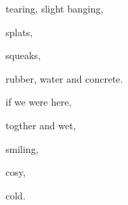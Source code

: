 \documentclass[extrafontsizes, 48pt]{memoir}
\newcommand\blankpage{%
    \null
    \thispagestyle{empty}%
    \addtocounter{page}{-1}%
    \newpage}
\begin{document}
	\begin{minipage}{.6\textwidth}
	tearing, slight banging,
	\end{minipage}
	\newpage

	\begin{minipage}{.6\textwidth}
	splats,
	\end{minipage}
	\newpage

	\begin{minipage}{.6\textwidth}
	squeaks,
	\end{minipage}
	\newpage

	\begin{minipage}{.6\textwidth}
	rubber, water and concrete.
	\afterpage{\blankpage}
	\end{minipage}
	\newpage

	\begin{minipage}{.6\textwidth}
	if we were here,
	\end{minipage}
	\newpage

	\begin{minipage}{.6\textwidth}
	togther and wet,
	\end{minipage}
	\newpage

	\begin{minipage}{.6\textwidth}
	smiling,
	\end{minipage}
	\newpage

	\begin{minipage}{.6\textwidth}
	cosy,
	\end{minipage}
	\newpage

	\begin{minipage}{.6\textwidth}
	cold.
	\afterpage{\blankpage}
	\end{minipage}
	\newpage
\end{document}
